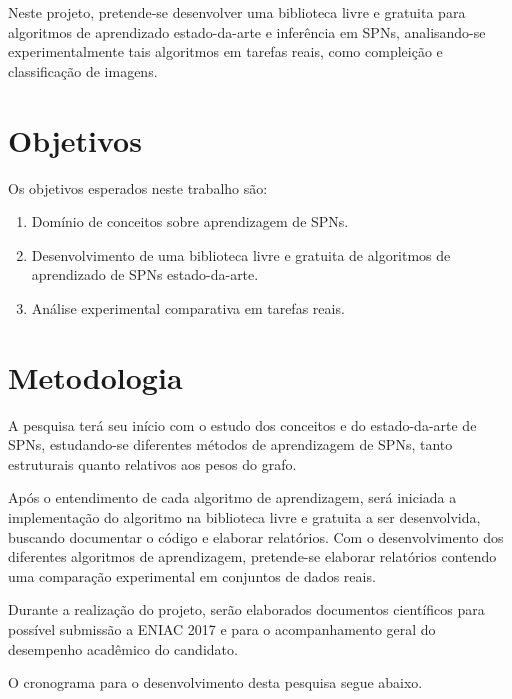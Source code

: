 \documentclass[12pt]{article}
\theoremstyle{plain}
\numberwithin{equation}{section}
\begin{document}
Neste projeto, pretende-se desenvolver uma biblioteca livre e gratuita para algoritmos de
aprendizado estado-da-arte e inferência em SPNs, analisando-se experimentalmente tais algoritmos em
tarefas reais, como compleição e classificação de imagens.
\newpage

\section{Objetivos}

Os objetivos esperados neste trabalho são:

\begin{enumerate}
  \item Domínio de conceitos sobre aprendizagem de SPNs.
  \item Desenvolvimento de uma biblioteca livre e gratuita de algoritmos de aprendizado de SPNs
    estado-da-arte.
  \item Análise experimental comparativa em tarefas reais.
\end{enumerate}

\section{Metodologia}

A pesquisa terá seu início com o estudo dos conceitos e do estado-da-arte de SPNs, estudando-se
diferentes métodos de aprendizagem de SPNs, tanto estruturais quanto relativos aos pesos do grafo.

Após o entendimento de cada algoritmo de aprendizagem, será iniciada a implementação do algoritmo
na biblioteca livre e gratuita a ser desenvolvida, buscando documentar o código e elaborar
relatórios. Com o desenvolvimento dos diferentes algoritmos de aprendizagem, pretende-se elaborar
relatórios contendo uma comparação experimental em conjuntos de dados reais.

Durante a realização do projeto, serão elaborados documentos científicos para possível submissão a
ENIAC 2017 e para o acompanhamento geral do desempenho acadêmico do candidato.

O cronograma para o desenvolvimento desta pesquisa segue abaixo.

\printbibliography[]
\end{document}
